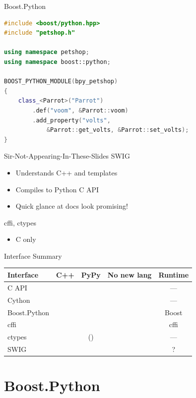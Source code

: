 \documentclass{beamer}
\begin{document}
\begin{frame}[fragile]{Boost.Python}
  \pause
  \begin{lstlisting}[language=c++]
#include <boost/python.hpp>
#include "petshop.h"

using namespace petshop;
using namespace boost::python;

BOOST_PYTHON_MODULE(bpy_petshop)
{
    class_<Parrot>("Parrot")
        .def("voom", &Parrot::voom)
        .add_property("volts",
            &Parrot::get_volts, &Parrot::set_volts);
}
  \end{lstlisting}
\end{frame}

\begin{frame}{Sir-Not-Appearing-In-These-Slides}
  SWIG
  \begin{itemize}
    \item Understands C++ and templates
    \item Compiles to Python C API
    \item Quick glance at docs look promising!
  \end{itemize}
  cffi, ctypes
  \begin{itemize}
    \item C only
  \end{itemize}
\end{frame}

\begin{frame}{Interface Summary}
  \def\yes{\textcolor{green!50!black}{\CheckmarkBold}}
  \def\no{\textcolor{red}{\XSolidBrush}}
  \begin{table}
    \begin{tabular}{lcccc}
      \toprule
      Interface & C++ & PyPy & No new lang & Runtime\\
      \midrule
      C API & \no & \no & \yes & ---\\
      Cython & \yes & \no & \no & ---\\
      Boost.Python & \yes & \no & \yes & Boost\\
      cffi  & \no & \yes & \yes & cffi\\
      ctypes & \no & (\yes) & \yes & ---\\
      SWIG & \yes & \no & \no & ?\\
      \bottomrule
    \end{tabular}
  \end{table}
\end{frame}

\section{Boost.Python}
\end{document}
